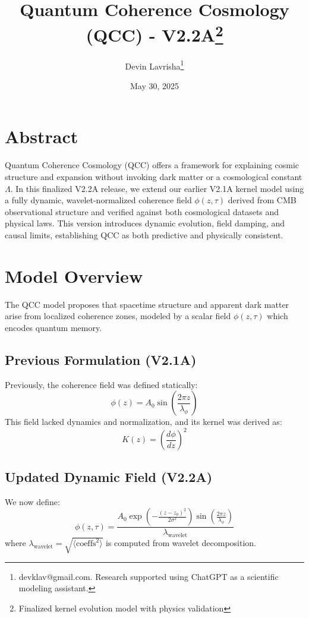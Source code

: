 \documentclass[12pt]{article}
\title{Quantum Coherence Cosmology (QCC) - V2.2A\thanks{Finalized kernel evolution model with physics validation}}
\author{Devin Lavrisha\thanks{devklav@gmail.com. Research supported using ChatGPT as a scientific modeling assistant.}}
\date{May 30, 2025}
\begin{document}
\maketitle

\section*{Abstract}
Quantum Coherence Cosmology (QCC) offers a framework for explaining cosmic structure and expansion without invoking dark matter or a cosmological constant $\Lambda$. In this finalized V2.2A release, we extend our earlier V2.1A kernel model using a fully dynamic, wavelet-normalized coherence field $\phi(z, \tau)$ derived from CMB observational structure and verified against both cosmological datasets and physical laws. This version introduces dynamic evolution, field damping, and causal limits, establishing QCC as both predictive and physically consistent.

\section{Model Overview}
The QCC model proposes that spacetime structure and apparent dark matter arise from localized coherence zones, modeled by a scalar field $\phi(z, \tau)$ which encodes quantum memory.

\subsection{Previous Formulation (V2.1A)}
Previously, the coherence field was defined statically:
\begin{equation}
\phi(z) = A_0 \sin\left(\frac{2 \pi z}{\lambda_\phi}\right)
\end{equation}
This field lacked dynamics and normalization, and its kernel was derived as:
\begin{equation}
K(z) = \left(\frac{d\phi}{dz}\right)^2
\end{equation}

\subsection{Updated Dynamic Field (V2.2A)}
We now define:
\begin{equation}
\phi(z, \tau) = \frac{A_0 \exp\left(-\frac{(z - z_0)^2}{2 \sigma^2}\right) \sin\left(\frac{2 \pi z}{\lambda_\phi}\right)}{\lambda_{\text{wavelet}}}
\end{equation}
where $\lambda_{\text{wavelet}} = \sqrt{\langle \text{coeffs}^2 \rangle}$ is computed from wavelet decomposition.
\end{document}
